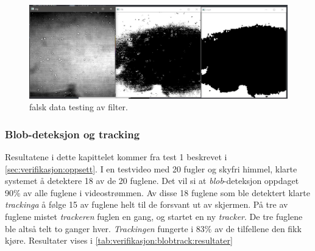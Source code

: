 \begin{figure}[H]
    \centering
    \includegraphics[width=.5\textwidth]{verifikasjon-test/Filtrering/stoy_filt4.JPG}
    \caption{falsk data testing av filter.}
    \label{fig:verifikasjon:filter:stoy:3}
\end{figure}



\subsubsection{Blob-deteksjon og tracking}\label{sec:verifikasjon:programvare:blob-detection_og_tracking}


Resultatene i dette kapittelet kommer fra test 1 beskrevet i \autoref{sec:verifikasjon:oppsett}.
I en testvideo med 20 fugler og skyfri himmel, klarte systemet å detektere 18 av de 20 fuglene. 
Det vil si at \textit{blob}-deteksjon oppdaget 90\% av alle fuglene i videostrømmen. 
Av disse 18 fuglene som ble detektert klarte \textit{trackinga} å følge 15 av fuglene helt til de forsvant ut av skjermen. 
På tre av fuglene mistet \textit{trackeren} fuglen en gang, og startet en ny \textit{tracker}. 
De tre fuglene ble altså telt to ganger hver. 
\textit{Trackingen} fungerte i $83\%$ av de tilfellene den fikk kjøre.
Resultater vises i \autoref{tab:verifikasjon:blobtrack:resultater}


